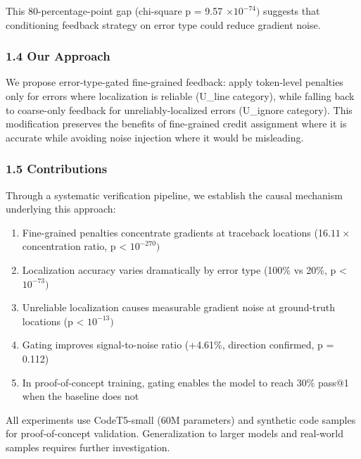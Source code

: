 This 80-percentage-point gap (chi-square p = 9.57 $\times 10^{-74})$ suggests that conditioning feedback strategy on error type could reduce gradient noise.

\subsubsection{1.4 Our Approach}

We propose error-type-gated fine-grained feedback: apply token-level penalties only for errors where localization is reliable (U\_line category), while falling back to coarse-only feedback for unreliably-localized errors (U\_ignore category). This modification preserves the benefits of fine-grained credit assignment where it is accurate while avoiding noise injection where it would be misleading.

\subsubsection{1.5 Contributions}

Through a systematic verification pipeline, we establish the causal mechanism underlying this approach:

\begin{enumerate}
\item Fine-grained penalties concentrate gradients at traceback locations (16.$11\times$ concentration ratio, p < $10^{-270})$
\item Localization accuracy varies dramatically by error type (100\% vs 20\%, p < $10^{-73})$
\item Unreliable localization causes measurable gradient noise at ground-truth locations (p < $10^{-13})$
\item Gating improves signal-to-noise ratio (+4.61\%, direction confirmed, p = 0.112)
\item In proof-of-concept training, gating enables the model to reach 30\% pass@1 when the baseline does not
\end{enumerate}

All experiments use CodeT5-small (60M parameters) and synthetic code samples for proof-of-concept validation. Generalization to larger models and real-world samples requires further investigation.

